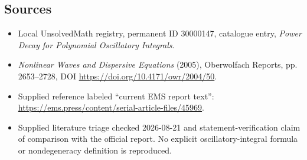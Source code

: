 \documentclass[11pt]{article}
\begin{document}
\subsection{Sources}
\begin{itemize}
\item Local UnsolvedMath registry, permanent ID 30000147, catalogue entry, \emph{Power Decay for Polynomial Oscillatory Integrals}.
\item \emph{Nonlinear Waves and Dispersive Equations} (2005), Oberwolfach Reports, pp. 2653--2728, DOI \url{https://doi.org/10.4171/owr/2004/50}.
\item Supplied reference labeled ``current EMS report text'': \url{https://ems.press/content/serial-article-files/45969}.
\item Supplied literature triage checked 2026-08-21 and statement-verification claim of comparison with the official report. No explicit oscillatory-integral formula or nondegeneracy definition is reproduced.
\end{itemize}
\end{document}
